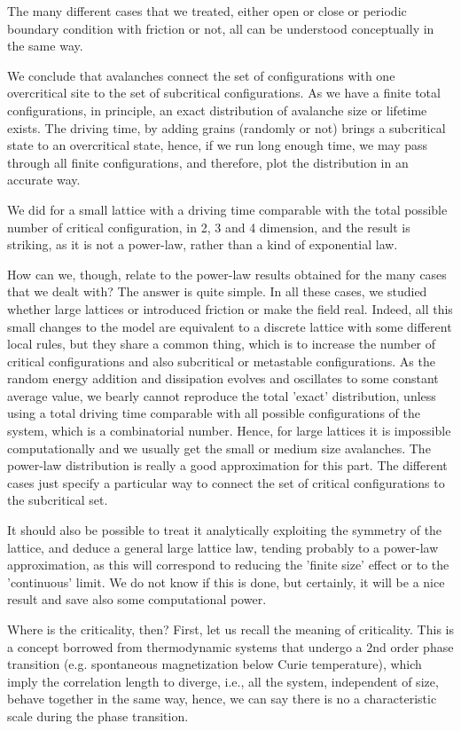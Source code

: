 The many different cases that we treated, either open or close or periodic boundary condition with friction or not, all can be understood conceptually in the same way.

We conclude that avalanches connect the set of configurations with one overcritical site to the set of subcritical configurations.
As we have a finite total configurations, in principle, an exact distribution of avalanche size or lifetime exists. 
The driving time, by adding grains (randomly or not) brings a subcritical state to an overcritical state,
hence, if we run long enough time, we may pass through all finite configurations, and therefore, plot the distribution in an accurate way.

We did for a small lattice with a driving time comparable with the total possible number of critical configuration, 
in 2, 3 and 4 dimension, and the result is striking, as it is not a power-law, rather than a kind of exponential law. 

How can we, though, relate to the power-law results obtained for the many cases that we dealt with? 
The answer is quite simple. In all these cases, we studied whether large lattices or introduced friction or make the field real. 
Indeed, all this small changes to the model are equivalent to a discrete lattice with some different local rules, but they share a common thing,
which is to increase the number of critical configurations and also subcritical or metastable configurations.
As the random energy addition and dissipation evolves and oscillates to some constant average value,
we bearly cannot reproduce the total 'exact' distribution, unless using a total driving time comparable with all possible configurations of the system, which is a combinatorial number. 
Hence, for large lattices it is impossible computationally and we usually get the small or medium size avalanches. 
The power-law distribution is really a good approximation for this part. 
The different cases just specify a particular way to connect the set of critical configurations to the subcritical set. 

It should also be possible to treat it analytically exploiting the symmetry of the lattice, and deduce a general large lattice law, 
tending probably to a power-law approximation, as this will correspond to reducing the 'finite size' effect or to the 'continuous' limit. 
We do not know if this is done, but certainly, it will be a nice result and save also some computational power. 


Where is the criticality, then? First, let us recall the meaning of criticality. This is a concept borrowed from thermodynamic systems 
that undergo a 2nd order phase transition (e.g. spontaneous magnetization below Curie temperature), 
which imply the correlation length to diverge, i.e., all the system, independent of size, behave together in the same way, 
hence, we can say there is no a characteristic scale during the phase transition.


